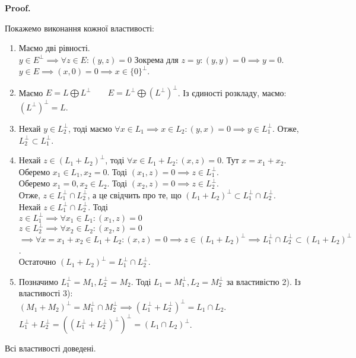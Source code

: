 \documentclass[a4paper, 10pt]{article}
\makeatletter
\theoremstyle{theoremdd}
\renewenvironment{proof}[1][Proof.\\]{\par
\pushQED{\hfill \qed}%
\normalfont \topsep6\p@\@plus6\p@\relax
\trivlist
\item\relax
{\bfseries
#1\@addpunct{.}}\hspace\labelsep\ignorespaces
}{%
\popQED\endtrivlist\@endpefalse
}
\makeatother
\begin{document}
\begin{proof}
Покажемо виконання кожної властивості:
\begin{enumerate}[topsep=-\parskip, wide=0pt, label={\arabic*)}]
\item Маємо дві рівності.\\
$y \in E^{\perp} \implies \forall z \in E: (y,z) = 0$ Зокрема для $z = y: (y,y) = 0 \implies y = 0$.\\
$y \in E \implies (x,0) = 0 \implies x \in \{0\}^\perp$.

\item Маємо $E = L \bigoplus L^{\perp} \qquad E = L^{\perp} \bigoplus (L^{\perp})^{\perp}$. Із єдиності розкладу, маємо: $(L^{\perp})^{\perp} = L$.

\item Нехай $y \in L_2^{\perp}$, тоді маємо $\forall x \in L_1 \implies x \in L_2: (y,x) = 0 \implies y \in L_1^{\perp}$. Отже, $L_2^{\perp} \subset L_1^{\perp}$.

\item Нехай $z \in (L_1+L_2)^\perp$, тоді $\forall x \in L_1+L_2: (x,z) = 0$. Тут $x = x_1 + x_2$. \\
Оберемо $x_1 \in L_1, x_2 = 0$. Тоді $(x_1,z) = 0 \implies z \in L_1^\perp$.\\
Оберемо $x_1 = 0, x_2 \in L_2$. Тоді $(x_2,z) = 0 \implies z \in L_2^\perp$.\\
Отже, $z \in L_1^\perp \cap L_2^\perp$, а це свідчить про те, що $(L_1+L_2)^\perp \subset L_1^\perp \cap L_2^\perp$.\\
Нехай $z \in L_1^\perp \cap L_2^\perp$. Тоді\\
$z \in L_1^\perp \implies \forall x_1 \in L_1: (x_1,z) = 0$\\
$z \in L_2^\perp \implies \forall x_2 \in L_2: (x_2,z) = 0$\\
$\implies \forall x = x_1+x_2 \in L_1+L_2: (x,z) = 0 \implies z \in (L_1+L_2)^\perp \implies L_1^\perp \cap L_2^\perp \subset (L_1+L_2)^\perp$.\\
Остаточно $(L_1+L_2)^{\perp} = L_1^{\perp} \cap L_2^{\perp}$.
\iffalse
3) $\forall z \in (L_1+L_2)^{\perp}: \forall x \in L_1, y \in L_2: x+y \in L_1+L_2: (z,x+y) = 0$\\
Тому $(z,x+y) = 0 \iff \begin{cases} (z,x) = 0 \\ (z,y) = 0 \end{cases} \iff \begin{cases} z \in L_1^{\perp} \\ z \in L_2^{\perp} \end{cases} \iff z \in L_1^{\perp} \cap L_2^{\perp}$
\fi
\item Позначимо $L_1^{\perp} = M_1, L_2^{\perp} = M_2$. Тоді $L_1 = M_1^{\perp}, L_2 = M_2^{\perp}$ за властивістю 2). Із властивості 3):\\
$(M_1+M_2)^{\perp} = M_1^{\perp} \cap M_2^{\perp} \implies (L_1^{\perp} + L_2^{\perp})^{\perp} = L_1 \cap L_2$.\\
$L_1^{\perp} + L_2^{\perp}=((L_1^{\perp} + L_2^{\perp})^{\perp})^{\perp} = (L_1 \cap L_2)^{\perp}$.
\end{enumerate}
Всі властивості доведені.
\end{proof}
\end{document}
